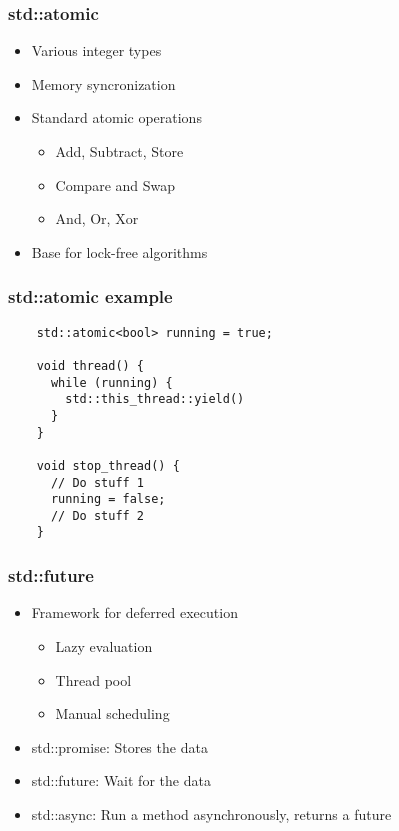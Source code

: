 \begin{frame}
  \frametitle{std::atomic}

  \begin{itemize}
  \item Various integer types
  \item Memory syncronization
  \item Standard atomic operations
    \begin{itemize}
    \item Add, Subtract, Store
    \item Compare and Swap
    \item And, Or, Xor
    \end{itemize}
  \item Base for lock-free algorithms
  \end{itemize}
\end{frame}


\begin{frame}[fragile]
  \frametitle{std::atomic example}

  \begin{verbatim}
    std::atomic<bool> running = true;

    void thread() {
      while (running) {
        std::this_thread::yield()
      }
    }

    void stop_thread() {
      // Do stuff 1
      running = false;
      // Do stuff 2
    }
  \end{verbatim}
\end{frame}


\begin{frame}
  \frametitle{std::future}

  \begin{itemize}
  \item Framework for deferred execution
    \begin{itemize}
    \item Lazy evaluation
    \item Thread pool
    \item Manual scheduling
    \end{itemize}
  \item std::promise: Stores the data
  \item std::future: Wait for the data
  \item std::async: Run a method asynchronously, returns a future
  \end{itemize}
\end{frame}


